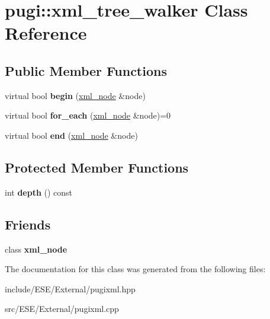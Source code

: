 \hypertarget{classpugi_1_1xml__tree__walker}{\section{pugi\-:\-:xml\-\_\-tree\-\_\-walker Class Reference}
\label{classpugi_1_1xml__tree__walker}
}
\subsection*{Public Member Functions}
\begin{DoxyCompactItemize}
\item 
\hypertarget{classpugi_1_1xml__tree__walker_a831cc2fc61a47e23673c85efc41bc7a2}{virtual bool {\bfseries begin} (\hyperlink{classpugi_1_1xml__node}{xml\-\_\-node} \&node)}\label{classpugi_1_1xml__tree__walker_a831cc2fc61a47e23673c85efc41bc7a2}

\item 
\hypertarget{classpugi_1_1xml__tree__walker_a309363c9d17ef3fc8cacc6f71fcbea88}{virtual bool {\bfseries for\-\_\-each} (\hyperlink{classpugi_1_1xml__node}{xml\-\_\-node} \&node)=0}\label{classpugi_1_1xml__tree__walker_a309363c9d17ef3fc8cacc6f71fcbea88}

\item 
\hypertarget{classpugi_1_1xml__tree__walker_a24e6ffd4a8351e2ee486440b6f784091}{virtual bool {\bfseries end} (\hyperlink{classpugi_1_1xml__node}{xml\-\_\-node} \&node)}\label{classpugi_1_1xml__tree__walker_a24e6ffd4a8351e2ee486440b6f784091}

\end{DoxyCompactItemize}
\subsection*{Protected Member Functions}
\begin{DoxyCompactItemize}
\item 
\hypertarget{classpugi_1_1xml__tree__walker_acb27ca9fea177b0741f29274cb0c805a}{int {\bfseries depth} () const }\label{classpugi_1_1xml__tree__walker_acb27ca9fea177b0741f29274cb0c805a}

\end{DoxyCompactItemize}
\subsection*{Friends}
\begin{DoxyCompactItemize}
\item 
\hypertarget{classpugi_1_1xml__tree__walker_a156d917a92815c7b593bd5ef19f6d5fb}{class {\bfseries xml\-\_\-node}}\label{classpugi_1_1xml__tree__walker_a156d917a92815c7b593bd5ef19f6d5fb}

\end{DoxyCompactItemize}


The documentation for this class was generated from the following files\-:\begin{DoxyCompactItemize}
\item 
include/\-E\-S\-E/\-External/pugixml.\-hpp\item 
src/\-E\-S\-E/\-External/pugixml.\-cpp\end{DoxyCompactItemize}
